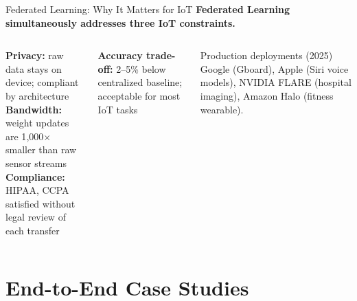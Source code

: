 \documentclass[aspectratio=169,11pt]{beamer}
\begin{document}
\begin{frame}{Federated Learning: Why It Matters for IoT}
    \small
    \textbf{Federated Learning simultaneously addresses three IoT constraints.}

    \vspace{0.25cm}
    \begin{columns}
        \textbf{Privacy:} raw data stays on device; compliant by architecture\\[6pt]
        \textbf{Bandwidth:} weight updates are 1{,}000$\times$ smaller than raw sensor streams\\[6pt]
        \textbf{Compliance:} HIPAA, CCPA satisfied without legal review of each transfer

        \vspace{0.2cm}
        \textbf{Accuracy trade-off:} 2--5\% below centralized baseline; acceptable for most IoT tasks

        \begin{exampleblock}{Production deployments (2025)}
            Google (Gboard), Apple (Siri voice models), NVIDIA FLARE (hospital imaging), Amazon Halo (fitness wearable).
        \end{exampleblock}
    \end{columns}
\end{frame}
\section{End-to-End Case Studies}
\end{document}
